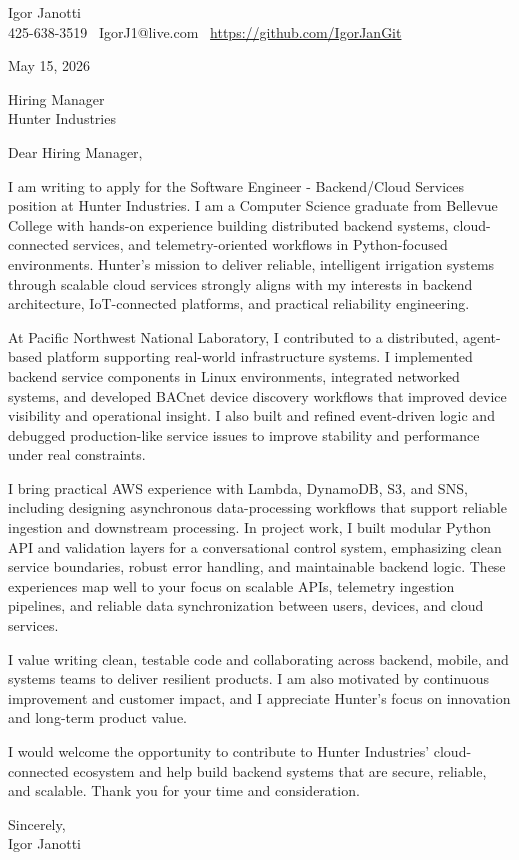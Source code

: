 \documentclass[11pt]{article}
\begin{document}
Igor Janotti\\
425-638-3519 \textbar\ IgorJ1@live.com \textbar\ \url{https://github.com/IgorJanGit}

May 15, 2026

Hiring Manager\\
Hunter Industries

Dear Hiring Manager,

I am writing to apply for the Software Engineer - Backend/Cloud Services position at Hunter Industries. I am a Computer Science graduate from Bellevue College with hands-on experience building distributed backend systems, cloud-connected services, and telemetry-oriented workflows in Python-focused environments. Hunter's mission to deliver reliable, intelligent irrigation systems through scalable cloud services strongly aligns with my interests in backend architecture, IoT-connected platforms, and practical reliability engineering.

At Pacific Northwest National Laboratory, I contributed to a distributed, agent-based platform supporting real-world infrastructure systems. I implemented backend service components in Linux environments, integrated networked systems, and developed BACnet device discovery workflows that improved device visibility and operational insight. I also built and refined event-driven logic and debugged production-like service issues to improve stability and performance under real constraints.

I bring practical AWS experience with Lambda, DynamoDB, S3, and SNS, including designing asynchronous data-processing workflows that support reliable ingestion and downstream processing. In project work, I built modular Python API and validation layers for a conversational control system, emphasizing clean service boundaries, robust error handling, and maintainable backend logic. These experiences map well to your focus on scalable APIs, telemetry ingestion pipelines, and reliable data synchronization between users, devices, and cloud services.

I value writing clean, testable code and collaborating across backend, mobile, and systems teams to deliver resilient products. I am also motivated by continuous improvement and customer impact, and I appreciate Hunter's focus on innovation and long-term product value.

I would welcome the opportunity to contribute to Hunter Industries' cloud-connected ecosystem and help build backend systems that are secure, reliable, and scalable. Thank you for your time and consideration.

Sincerely,\\
Igor Janotti
\end{document}

